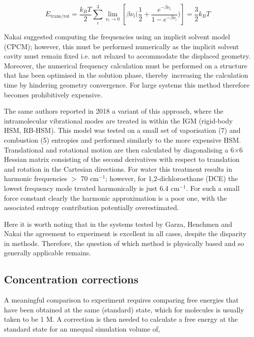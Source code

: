 \documentclass[../main.tex]{subfiles}
\begin{document}
\begin{equation}
E_\text{trans/rot} = \frac{k_B T}{2} \sum_i^3 \lim\limits_{\nu_i \rightarrow 0} \left[ {\beta\nu_i} {\Big (} \frac{1}{2} + \frac{e^{-\beta\nu_i}}{1-e^{-\beta\nu_i}} {\Big )}\right] = \frac{3}{2} k_B T
\end{equation} 

Nakai suggested computing the frequencies using an implicit solvent model (CPCM); however, this must be performed numerically as the implicit solvent cavity must remain fixed i.e. not relaxed to accommodate the displaced geometry. Moreover, the numerical frequency calculation must be performed on a structure that has been optimised in the solution phase, thereby increasing the calculation time by hindering geometry convergence. For large systems this method therefore becomes prohibitively expensive.


The same authors reported in 2018 a variant of this approach,\cite{Tarumi2018} where the intramolecular vibrational modes are treated in within the IGM (rigid-body HSM, RB-HSM). This model was tested on a small set of vaporisation (7) and combustion (5) entropies and performed similarly to the more expensive HSM. Translational and rotational motion are then calculated by diagonalising a 6$\times$6 Hessian matrix consisting of the second derivatives with respect to translation and rotation in the Cartesian directions. For water this treatment results in harmonic frequencies $>$ 70 cm$^{-1}$; however, for 1,2-dichloroethane (DCE) the lowest frequency mode treated harmonically is just 6.4 cm$^{-1}$. For such a small force constant clearly the harmonic approximation is a poor one, with the associated entropy contribution potentially overestimated.

Here it is worth noting that in the systems tested by Garza, Henchmen and Nakai the agreement to experiment is excellent in all cases, despite the disparity in methods. Therefore, the question of which method is physically based and so generally applicable remains.

\subsection{Concentration corrections}

A meaningful comparison to experiment requires comparing free energies that have been obtained at the same (standard) state, which for molecules is usually taken to be 1 M. A correction is then needed to calculate a free energy at the standard state for an unequal simulation volume of,\cite{General2010} 
\end{document}
